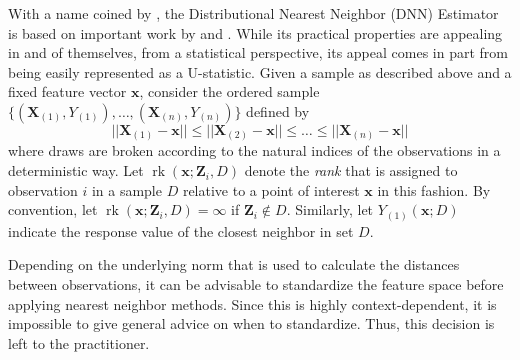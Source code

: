 \documentclass[letterpaper,10pt]{article}
\numberwithin{equation}{section}
\numberwithin{theorem}{section}
\theoremstyle{definition}
\newcommand{\1}{\mathbb{1}}
\begin{document}
With a name coined by \citet{demirkaya_optimal_2024}, the Distributional Nearest Neighbor (DNN) Estimator is based on important work by \citet{steele_exact_2009} and \citet{biau_rate_2010}.
While its practical properties are appealing in and of themselves, from a statistical perspective, its appeal comes in part from being easily represented as a U-statistic.
Given a sample as described above and a fixed feature vector $\mathbf{x}$, consider the ordered sample $\{(\mathbf{X}_{(1)}, Y_{(1)}), \dotsc, (\mathbf{X}_{(n)}, Y_{(n)})\}$ defined by
\begin{equation}\label{ordering}
	||\mathbf{X}_{(1)} - \mathbf{x}|| \leq ||\mathbf{X}_{(2)} - \mathbf{x}|| \leq \dotsc \leq ||\mathbf{X}_{(n)} - \mathbf{x}||
\end{equation}
where draws are broken according to the natural indices of the observations in a deterministic way.
Let $\operatorname{rk}(\mathbf{x}; \mathbf{Z}_i, D)$ denote the \textit{rank} that is assigned to observation $i$ in a sample $D$ relative to a point of interest $\mathbf{x}$ in this fashion.
By convention, let $\operatorname{rk}(\mathbf{x}; \mathbf{Z}_i, D) = \infty$ if $\mathbf{Z}_i \not\in D$.
Similarly, let $Y_{(1)}(\mathbf{x}; D)$ indicate the response value of the closest neighbor in set $D$.

\vspace{0.5cm}
\begin{remark}[Standardization]
	Depending on the underlying norm that is used to calculate the distances between observations, it can be advisable to standardize the feature space before applying nearest neighbor methods.
	Since this is highly context-dependent, it is impossible to give general advice on when to standardize.
	Thus, this decision is left to the practitioner.
\end{remark}
\end{document}
